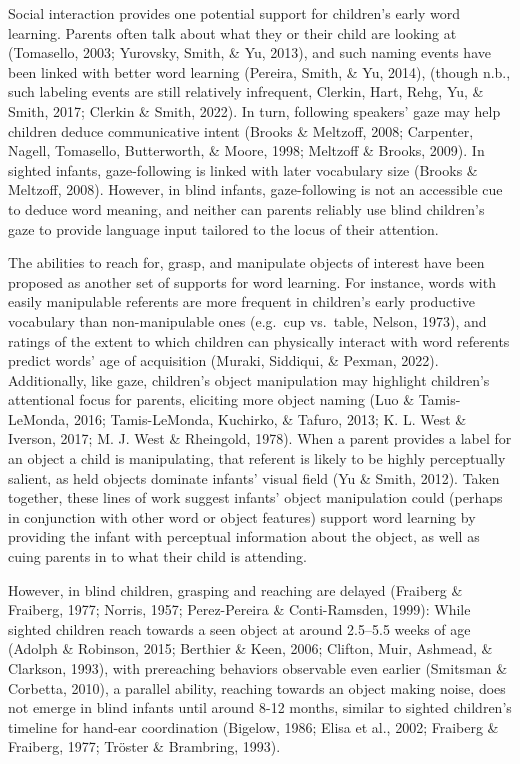 \documentclass[
  man,floatsintext]{apa6}
\begin{document}
Social interaction provides one potential support for children's early word learning. Parents often talk about what they or their child are looking at (Tomasello, 2003; Yurovsky, Smith, \& Yu, 2013), and such naming events have been linked with better word learning (Pereira, Smith, \& Yu, 2014), (though n.b., such labeling events are still relatively infrequent, Clerkin, Hart, Rehg, Yu, \& Smith, 2017; Clerkin \& Smith, 2022). In turn, following speakers' gaze may help children deduce communicative intent (Brooks \& Meltzoff, 2008; Carpenter, Nagell, Tomasello, Butterworth, \& Moore, 1998; Meltzoff \& Brooks, 2009). In sighted infants, gaze-following is linked with later vocabulary size (Brooks \& Meltzoff, 2008). However, in blind infants, gaze-following is not an accessible cue to deduce word meaning, and neither can parents reliably use blind children's gaze to provide language input tailored to the locus of their attention.

The abilities to reach for, grasp, and manipulate objects of interest have been proposed as another set of supports for word learning. For instance, words with easily manipulable referents are more frequent in children's early productive vocabulary than non-manipulable ones (e.g.~cup vs.~table, Nelson, 1973), and ratings of the extent to which children can physically interact with word referents predict words' age of acquisition (Muraki, Siddiqui, \& Pexman, 2022). Additionally, like gaze, children's object manipulation may highlight children's attentional focus for parents, eliciting more object naming (Luo \& Tamis-LeMonda, 2016; Tamis-LeMonda, Kuchirko, \& Tafuro, 2013; K. L. West \& Iverson, 2017; M. J. West \& Rheingold, 1978). When a parent provides a label for an object a child is manipulating, that referent is likely to be highly perceptually salient, as held objects dominate infants' visual field (Yu \& Smith, 2012). Taken together, these lines of work suggest infants' object manipulation could (perhaps in conjunction with other word or object features) support word learning by providing the infant with perceptual information about the object, as well as cuing parents in to what their child is attending.

However, in blind children, grasping and reaching are delayed (Fraiberg \& Fraiberg, 1977; Norris, 1957; Perez-Pereira \& Conti-Ramsden, 1999): While sighted children reach towards a seen object at around 2.5--5.5 weeks of age (Adolph \& Robinson, 2015; Berthier \& Keen, 2006; Clifton, Muir, Ashmead, \& Clarkson, 1993), with prereaching behaviors observable even earlier (Smitsman \& Corbetta, 2010), a parallel ability, reaching towards an object making noise, does not emerge in blind infants until around 8-12 months, similar to sighted children's timeline for hand-ear coordination (Bigelow, 1986; Elisa et al., 2002; Fraiberg \& Fraiberg, 1977; Tröster \& Brambring, 1993).
\end{document}
